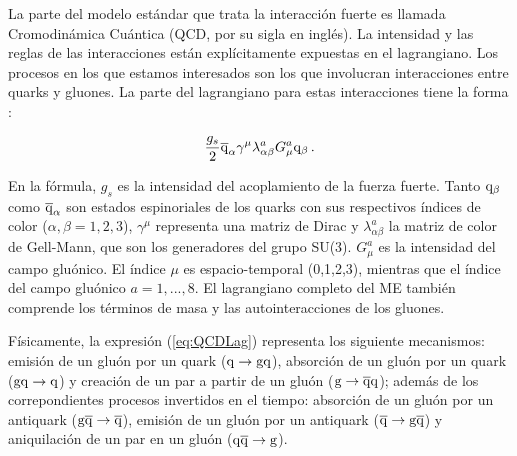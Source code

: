 \documentclass[a4paper,12pt]{article}
\begin{document}
La parte del modelo estándar que trata la interacción fuerte es llamada Cromodinámica Cuántica (QCD, por su sigla en inglés). La intensidad y las reglas de las interacciones están explícitamente expuestas en el lagrangiano. Los procesos en los que estamos interesados son los que involucran interacciones entre quarks y gluones. La parte del lagrangiano para estas interacciones tiene la forma \cite{Kane:1993}:

 \begin{equation}
  \frac{g_s}2 \overline{\mathrm q}_\alpha \gamma^\mu \lambda^a_{\alpha \beta} G_\mu^a {\mathrm q}_\beta\label{eq:QCDLag}
  \, .
\end{equation}

En la fórmula, $g_s$ es la intensidad del acoplamiento de la fuerza fuerte. Tanto ${\mathrm q}_\beta$ como $\overline{\mathrm q}_\alpha$ son estados espinoriales de los quarks con sus respectivos índices de color ($\alpha,\beta = 1,2,3$), $\gamma^\mu$ representa una matriz de Dirac y $\lambda^a_{\alpha\beta}$ la matriz de color de Gell-Mann, que son los generadores del grupo SU(3). $G_\mu^a$ es la intensidad del campo gluónico. El índice $\mu$ es espacio-temporal (0,1,2,3), mientras que el índice del campo gluónico $a=1,...,8$. El lagrangiano completo del ME también comprende los términos de masa y las autointeracciones de los gluones.

Físicamente, la expresión (\ref{eq:QCDLag}) representa los siguiente mecanismos: emisión de un gluón por un quark (${\mathrm q}\to{\mathrm g}{\mathrm q}$), absorción de un gluón por un quark (${\mathrm g}{\mathrm q}\to{\mathrm q}$) y creación de un par a partir de un gluón (${\mathrm g}\to\overline{\mathrm q}{\mathrm q}$); además de los correpondientes procesos invertidos en el tiempo: absorción de un gluón por un antiquark (${\mathrm g}\overline{\mathrm q}\to\overline{\mathrm q}$), emisión de un gluón por un antiquark ($\overline{\mathrm q}\to{\mathrm g}\overline{\mathrm q}$) y aniquilación de un par en un gluón (${\mathrm q}\overline{\mathrm q}\to{\mathrm g}$).
\end{document}
